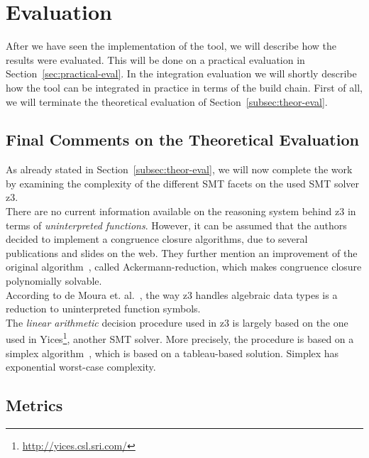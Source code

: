 
\chapter{Evaluation}\label{chap:evaluation}

After we have seen the implementation of the tool, we will describe how the results were evaluated. This will be done on a practical evaluation in Section~\ref{sec:practical-eval}. In the integration evaluation we will shortly describe how the tool can be integrated in practice in terms of the build chain. First of all, we will terminate the theoretical evaluation of Section~\ref{subsec:theor-eval}.


\section{Final Comments on the Theoretical Evaluation}

As already stated in Section~\ref{subsec:theor-eval}, we will now complete the work by examining the complexity of the different SMT facets on the used SMT solver z3. \\

There are no current information available on the reasoning system behind z3 in terms of \emph{uninterpreted functions}. However, it can be assumed that the authors decided to implement a congruence closure algorithms, due to several publications and slides on the web. They further 
mention an improvement of the original algorithm~\cite{z3-solver}, called Ackermann-reduction, which makes congruence closure polynomially solvable.\\

According to de Moura et. al.~\cite{tractability}, the way z3 handles algebraic data types is a reduction to uninterpreted function symbols.\\

The \emph{linear arithmetic} decision procedure used in z3 is largely based on the one used in Yices\footnote{\url{http://yices.csl.sri.com/}}, another SMT solver. More precisely, the procedure is based on a simplex algorithm~\cite{lin-arith}, which is based on a tableau-based solution. Simplex has exponential worst-case complexity. 


\section{Metrics}\label{sec:metrics}

